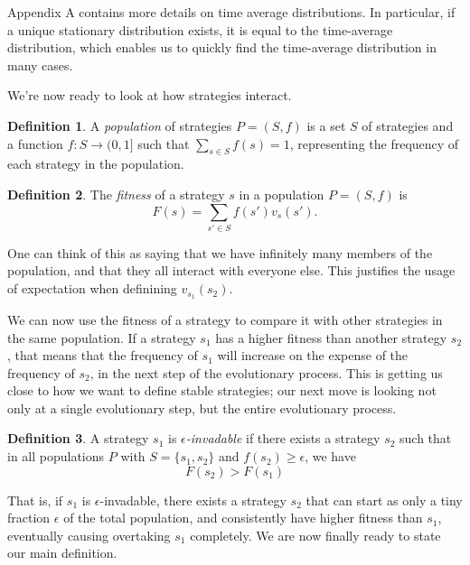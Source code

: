 \documentclass[11pt]{amsart}
\theoremstyle{definition}
\newtheorem{definition}{Definition}
\theoremstyle{remark}
\begin{document}
Appendix A contains more details on time average distributions. In particular, if a unique stationary distribution exists, it is equal to the time-average distribution, which enables us to quickly find the time-average distribution in many cases.

We're now ready to look at how strategies interact.

\begin{definition}
  A \textit{population} of strategies $P = (S, f)$ is a set $S$ of strategies and a function $f : S \to (0,1]$ such that $\sum_{s \in S} f(s) = 1$, representing the frequency of each strategy in the population.
\end{definition}

\begin{definition}
  The \textit{fitness} of a strategy $s$ in a population $P = (S, f)$ is \begin{equation*}
    F(s) = \sum_{s' \in S} f(s') v_s(s').
  \end{equation*}
\end{definition}

One can think of this as saying that we have infinitely many members of the population, and that they all interact with everyone else. This justifies the usage of expectation when definining $v_{s_1}(s_2)$.

We can now use the fitness of a strategy to compare it with other strategies in the same population. If a strategy $s_1$ has a higher fitness than another strategy $s_2$, that means that the frequency of $s_1$ will increase on the expense of the frequency of $s_2$, in the next step of the evolutionary process. This is getting us close to how we want to define stable strategies; our next move is looking not only at a single evolutionary step, but the entire evolutionary process.

\begin{definition}
  A strategy $s_1$ is \textit{$\epsilon$-invadable} if there exists a strategy $s_2$ such that in all populations $P$ with $S = \{s_1,s_2\}$ and $f(s_2) \geq \epsilon$, we have 
  \begin{equation*}
    \label{fitnesscond}
    F(s_2) > F(s_1)
  \end{equation*}
\end{definition}

That is, if $s_1$ is $\epsilon$-invadable, there exists a strategy $s_2$ that can start as only a tiny fraction $\epsilon$ of the total population, and consistently have higher fitness than $s_1$, eventually causing overtaking $s_1$ completely. We are now finally ready to state our main definition.
\end{document}
